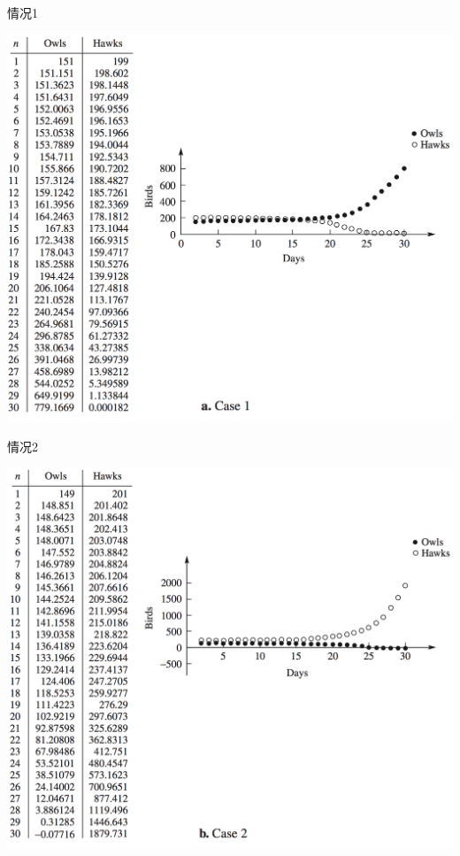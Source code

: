 \documentclass[UTF8, mathserif]{ctexbeamer}
\begin{document}
\begin{frame}{情况1}
  \begin{center}
    \includegraphics[height=.9\textheight{}]{owl-1.png}
  \end{center}  
\end{frame}

\begin{frame}{情况2}
  \begin{center}
    \includegraphics[height=.9\textheight{}]{owl-2.png}
  \end{center}  
\end{frame}
\end{document}
